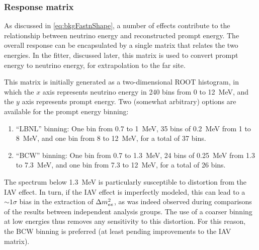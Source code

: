\documentclass[../thesis.tex]{subfiles}
\begin{document}
\subsubsection{Response matrix}

As discussed in \autoref{eq:bkgFastnShape}, a number of effects contribute to the relationship between neutrino energy and reconstructed prompt energy. The overall response can be encapsulated by a single matrix that relates the two energies. In the fitter, discussed later, this matrix is used to convert prompt energy to neutrino energy, for extrapolation to the far site.

This matrix is initially generated as a two-dimensional ROOT histogram, in which the $x$ axis represents neutrino energy in 240 bins from 0 to 12~MeV, and the $y$ axis represents prompt energy. Two (somewhat arbitrary) options are available for the prompt energy binning:

\begin{enumerate}
\item ``LBNL'' binning: One bin from 0.7 to 1~MeV, 35 bins of 0.2~MeV from 1 to 8~MeV, and one bin from 8 to 12~MeV, for a total of 37 bins.
\item ``BCW'' binning: One bin from 0.7 to 1.3~MeV, 24 bins of 0.25~MeV from 1.3 to 7.3~MeV, and one bin from 7.3 to 12~MeV, for a total of 26 bins.
\end{enumerate}

The spectrum below 1.3~MeV is particularly susceptible to distortion from the IAV effect. In turn, if the IAV effect is imperfectly modeled, this can lead to a $\sim1\sigma$ bias in the extraction of $\Delta m^2_{ee}$, as was indeed observed during comparisons of the results between independent analysis groups. The use of a coarser binning at low energies thus removes any sensitivity to this distortion. For this reason, the BCW binning is preferred (at least pending improvements to the IAV matrix).

\begin{comment}
  I don't see any reason to mention the fact that a finer binning (2880 instead of 240) is used internally by the toy MC when generating this matrix. With the standard 240 bins, the edges line up with both the LBNL and BCW edges, so there shouldn't be any benefit from using a finer binning.

  deleted: Internally, the toy MC normally represents both neutrino and prompt energy using 240 bins (of 50~keV) from 0 to 12~MeV.
\end{comment}
\end{document}
